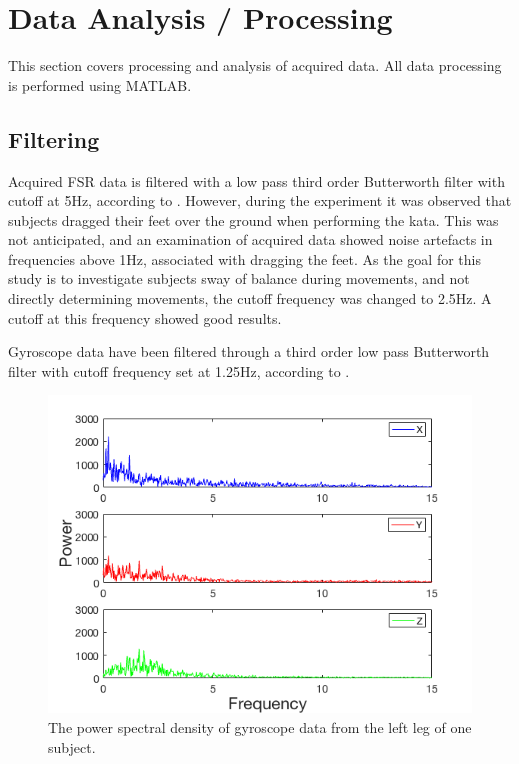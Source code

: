 \section{Data Analysis / Processing}
This section covers processing and analysis of acquired data. All data processing is performed using MATLAB. 

\subsection{Filtering} \label{subsec:filtering}


Acquired FSR data is filtered with a low pass third order Butterworth filter with cutoff at 5Hz, according to \cite{Prieto1996}. 
However, during the experiment it was observed that subjects dragged their feet over the ground when performing the kata. This was not anticipated, and an examination of acquired data showed noise artefacts in frequencies above 1Hz, associated with dragging the feet. As the goal for this study is to investigate subjects sway of balance during movements, and not directly determining movements, the cutoff frequency was changed to 2.5Hz. A cutoff at this frequency showed good results.

Gyroscope data have been filtered through a third order low pass Butterworth filter with cutoff frequency set at 1.25Hz, according to \cite{Alberts2015}. 


\begin{figure}[H]
	\includegraphics[width=.6\textwidth]{figures/gyroFFTPlot}
	\caption{The power spectral density of gyroscope data from the left leg of one subject.}
	\label{fig:gyroFFTPlot}  %
\end{figure}



